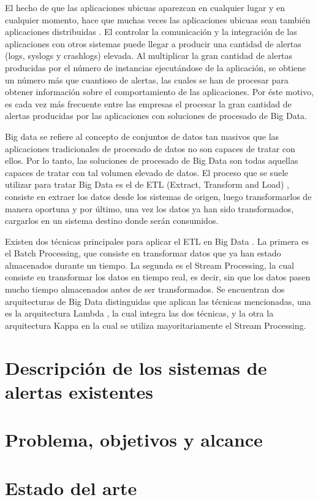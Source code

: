 El hecho de que las aplicaciones ubicuas aparezcan en cualquier lugar y en cualquier momento, hace que muchas veces las aplicaciones ubicuas sean también aplicaciones distribuidas \cite{Tfg:distributedapp}. El controlar la comunicación y la integración de las aplicaciones con otros sistemas puede llegar a producir una cantidad de alertas (logs, syslogs y crashlogs) elevada. Al multiplicar la gran cantidad de alertas producidas por el número de instancias ejecutándose de la aplicación, se obtiene un número más que cuantioso de alertas, las cuales se han de procesar para obtener información sobre el comportamiento de las aplicaciones. Por éste motivo, es cada vez más frecuente entre las empresas el procesar la gran cantidad de alertas producidas por las aplicaciones con soluciones de procesado de Big Data.

Big data \cite{Tfg:bigdata} se refiere al concepto de conjuntos de datos tan masivos que las aplicaciones tradicionales de procesado de datos no son capaces de tratar con ellos. Por lo tanto, las soluciones de procesado de Big Data son todas aquellas capaces de tratar con tal volumen elevado de datos. El proceso que se suele utilizar para tratar Big Data es el de ETL (Extract, Transform and Load) \cite{Tfg:etl}, consiste en extraer los datos desde los sistemas de origen, luego transformarlos de manera oportuna y por último, una vez los datos ya han sido transformados, cargarlos en un sistema destino donde serán consumidos. 

Existen dos técnicas principales para aplicar el ETL en Big Data \cite{Tfg:batchstream}. La primera es el Batch Processing, que consiste en transformar datos que ya han estado almacenados durante un tiempo. La segunda es el Stream Processing, la cual consiste en transformar los datos en tiempo real, es decir, sin que los datos pasen mucho tiempo almacenados antes de ser transformados. Se encuentran dos arquitecturas de Big Data distinguidas que aplican las técnicas mencionadas, una es la arquitectura Lambda \cite{Tfg:lambda}, la cual integra las dos técnicas, y la otra la arquitectura Kappa \cite{Tfg:kappa} en la cual se utiliza mayoritariamente el Stream Processing.

\section{Descripción de los sistemas de alertas existentes}

\section{Problema, objetivos y alcance}



\section{Estado del arte}

